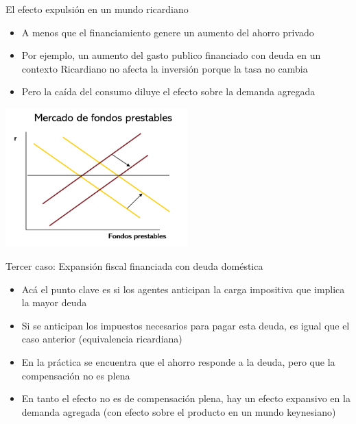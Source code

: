 \documentclass{beamer}
\begin{document}
\begin{frame}{El efecto expulsión en un mundo ricardiano}
    \begin{itemize}
    \scriptsize\item A menos que el financiamiento genere un aumento del ahorro privado
    \scriptsize\item Por ejemplo, un aumento del gasto publico financiado con deuda en un contexto Ricardiano no afecta la inversión porque la tasa no cambia
    \scriptsize\item Pero la caída del consumo diluye el efecto sobre la demanda agregada
    \end{itemize}
    
    \vspace{0.2cm}
    
    \centering\includegraphics[width=7cm]{P88.png}\

\end{frame}

\begin{frame}{Tercer caso: Expansión fiscal financiada con deuda doméstica}
    \begin{itemize}
    \item Acá el punto clave es si los agentes anticipan la carga impositiva que implica la mayor deuda
    \item Si se anticipan los impuestos necesarios para pagar esta deuda, es igual que el caso anterior (equivalencia ricardiana)
    \item En la práctica se encuentra que el ahorro responde a la deuda, pero que la compensación no es plena
    \item En tanto el efecto no es de compensación plena, hay un efecto expansivo en la demanda agregada (con efecto sobre el producto en un mundo keynesiano)

    \end{itemize}

\end{frame}
\end{document}
